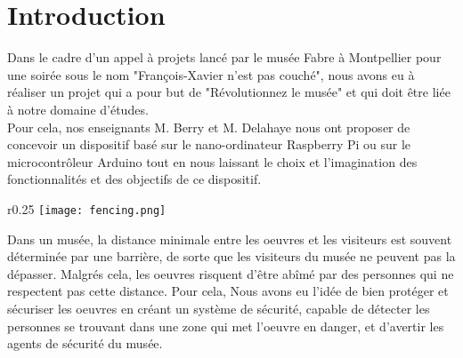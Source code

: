 \section{Introduction}
Dans le cadre d'un appel à projets lancé par le musée Fabre à Montpellier pour une soirée sous le nom "François-Xavier n’est pas couché", nous avons eu à réaliser un projet qui a pour but de "Révolutionnez le musée" et qui doit être liée à notre domaine d'études.\\
Pour cela, nos enseignants M. Berry et M. Delahaye nous ont proposer de concevoir un dispositif basé sur le nano-ordinateur Raspberry Pi ou sur le microcontrôleur Arduino tout en nous laissant le choix et l'imagination des fonctionnalités et des objectifs de ce dispositif.\\

\begin{wrapfigure}{r}{0.25\textwidth} %
    \centering
    \texttt{[image: fencing.png]}
\end{wrapfigure}

Dans un musée, la distance minimale entre les oeuvres et les visiteurs est souvent déterminée par une barrière, de sorte que les visiteurs du musée ne peuvent pas la dépasser. Malgrés cela, les oeuvres risquent d’être abîmé par des personnes qui ne respectent pas cette distance.
Pour cela, Nous avons eu l’idée de bien protéger et sécuriser les oeuvres en créant un système de sécurité, capable de détecter les personnes se trouvant dans une zone qui met l’oeuvre en danger, et d’avertir les agents de sécurité du musée. 

\clearpage

